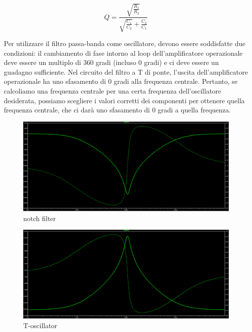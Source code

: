 \documentclass{article}
\theoremstyle{definition}
\begin{document}
\begin{equation}
    Q = \frac{\sqrt{\frac{R_1}{R_2}}}{\sqrt{\frac{C_1}{C_2}} + {\frac{C_2}{C_1}}}
\end{equation}


Per utilizzare il filtro passa-banda come oscillatore, devono essere soddisfatte due condizioni: il cambiamento di fase intorno al loop dell'amplificatore operazionale deve essere un multiplo di 360 gradi (incluso 0 gradi) e ci deve essere un guadagno sufficiente.
Nel circuito del filtro a T di ponte, l'uscita dell'amplificatore operazionale ha uno sfasamento di 0 gradi alla frequenza centrale. Pertanto, se calcoliamo una frequenza centrale per una certa frequenza dell'oscillatore desiderata, possiamo scegliere i valori corretti dei componenti per ottenere quella frequenza centrale, che ci darà uno sfasamento di 0 gradi a quella frequenza. 

\begin{figure}[htp]
    \centering
    \includegraphics[width=\textwidth]{notch2.png} 
    \caption{notch filter}
    \label{fig:Notch-filter}
\end{figure}

\begin{figure}[htp]
    \centering
    \includegraphics[width=\textwidth]{toscillatorefrequency.png} 
    \caption{T-oscillator}
    \label{fig:Toscillator-plot}
\end{figure}
\end{document}
